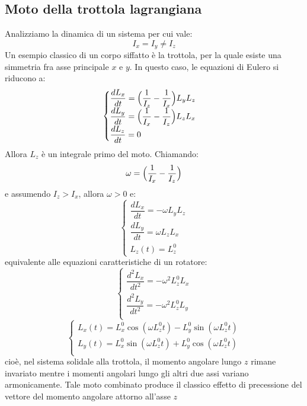 \documentclass[a4paper,openany]{article}
\begin{document}
	\subsection{Moto della trottola lagrangiana}
	Analizziamo la dinamica di un sistema per cui vale:
	$$
	I_x = I_y \neq I_z
	$$
	Un esempio classico di un corpo siffatto è la trottola, per la quale esiste una simmetria fra asse principale $x \mbox{ e }y$. In questo caso, le equazioni di Eulero si riducono a:
	\begin{equation}
		\begin{cases}
			\dfrac{dL_x}{dt} = \Bigl(\dfrac{1}{I_z}-\dfrac{1}{I_x}\Bigl) L_yL_z \\
			\dfrac{dL_y}{dt} = \Bigl(\dfrac{1}{I_x}-\dfrac{1}{I_z}\Bigl) L_zL_x \\
			\dfrac{dL_z}{dt} = 0
		\end{cases}
	\end{equation}
	Allora $L_z$ è un integrale primo del moto. Chiamando:
	$$
	\omega = \Bigl(\dfrac{1}{I_x}-\dfrac{1}{I_z}\Bigl)
	$$
	e assumendo $I_z > I_x$, allora $\omega > 0$ e:
	\begin{equation}
		\begin{cases}
			\dfrac{dL_x}{dt} = -\omega L_yL_z \\
			
			\dfrac{dL_y}{dt} = \omega L_zL_x  \\
			
			L_z (t) = L_z^{0}
		\end{cases}
	\end{equation}
	equivalente alle equazioni caratteristiche di un rotatore: 
	\begin{equation}
		\begin{cases}
			\dfrac{d^2L_x}{dt^2} = -\omega^2 L_{z}^{0} L_x \\
			\dfrac{d^2L_y}{dt^2} = -\omega^2 L_{z}^{0} L_y \\ 
		\end{cases}
	\end{equation}
	\begin{equation}
		\begin{cases}
			L_x(t) = L_x^0 \cos(\omega L_z^0 t) - L_y^0 \sin(\omega L_z^0 t)\\
			L_y(t) = L_x^0 \sin(\omega L_z^0 t) + L_y^0 \cos(\omega L_z^0 t) \\ 
		\end{cases}
	\end{equation}
	cioè, nel sistema solidale alla trottola, il momento angolare lungo $z$ rimane invariato mentre i momenti angolari lungo gli altri due assi variano armonicamente. Tale moto combinato produce il classico effetto di precessione del vettore del momento angolare attorno all'asse $z$
	
\end{document}
